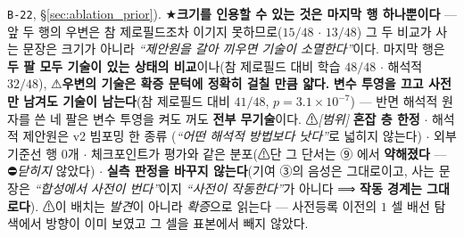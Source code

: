 \documentclass[11pt]{report}
\numberwithin{equation}{chapter}
\numberwithin{figure}{chapter}
\numberwithin{table}{chapter}
\begin{document}
\begin{enumerate}
        \texttt{B-22}, \S\ref{sec:ablation_prior}).
        ★\textbf{크기를 인용할 수 있는 것은 마지막 행 하나뿐이다} --- 앞 두 행의 우변은
        참 제로필드조차 이기지 못하므로($15/48$ $\cdot$ $13/48$) 그 두 비교가 사는 문장은
        크기가 아니라 \emph{``제안원을 갈아 끼우면 기술이 소멸한다''}이다. 마지막 행은
        \textbf{두 팔 모두 기술이 있는 상태의 비교}이나(참 제로필드 대비 학습 $48/48$
        $\cdot$ 해석적 $32/48$), ⚠\textbf{우변의 기술은 확증 문턱에 정확히 걸칠 만큼
        얇다.}
        \textbf{변수 투영을 끄고 사전만 남겨도 기술이 남는다}(참 제로필드 대비 $41/48$,
        $p = 3.1\times10^{-7}$) --- 반면 해석적 원자를 쓴 네 팔은 변수 투영을 켜도 꺼도
        \textbf{전부 무기술}이다.
        ⚠\emph{[범위]} \textbf{혼잡 층 한정} $\cdot$ 해석적 제안원은 v2 빔포밍 한 종류
        (\emph{``어떤 해석적 방법보다 낫다''}로 넓히지 않는다) $\cdot$ 외부 기준선 행
        $0$개 $\cdot$ 체크포인트가 평가와 같은 분포(⚠단 그 단서는 ⑨ 에서
        \textbf{약해졌다} --- ⛔\emph{닫히지} 않았다) $\cdot$ \textbf{실측 판정을 바꾸지
        않는다}(기여 ③의 음성은 그대로이고, 사는 문장은 \emph{``합성에서 사전이 번다''}이지
        \emph{``사전이 작동한다''}가 아니다 ⟹ \textbf{작동 경계는 그대로다}).
        ⚠이 배치는 \emph{발견}이 아니라 \emph{확증}으로 읽는다 --- 사전등록 이전의
        $1$ 셀 배선 탐색에서 방향이 이미 보였고 그 셀을 표본에서 빼지 않았다.


\end{enumerate}
\end{document}
